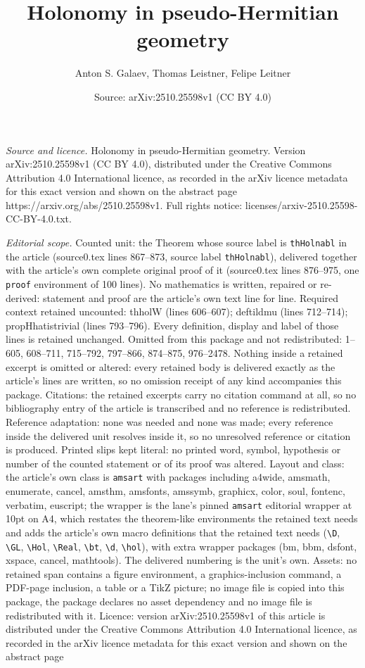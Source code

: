 \documentclass[10pt,a4paper]{amsart}
\title[Holonomy in pseudo-Hermitian geometry]{Holonomy in pseudo-Hermitian geometry}
\author{Anton S. Galaev, Thomas Leistner, Felipe Leitner}
\date{Source: arXiv:2510.25598v1 (CC BY 4.0)}
\begin{document}
\maketitle

\noindent\emph{Source and licence.} Holonomy in pseudo-Hermitian geometry. Version arXiv:2510.25598v1 (CC BY 4.0), distributed under the Creative Commons Attribution 4.0 International licence, as recorded in the arXiv licence metadata for this exact version and shown on the abstract page https://arxiv.org/abs/2510.25598v1. Full rights notice: licenses/arxiv-2510.25598-CC-BY-4.0.txt.\par\smallskip

\noindent\textit{Editorial scope.} Counted unit: the Theorem whose source label is \texttt{thHolnabl} in the article (source0.tex lines 867--873, source label \texttt{thHolnabl}), delivered together with the article's own complete original proof of it (source0.tex lines 876--975, one \texttt{proof} environment of 100 lines). No mathematics is written, repaired or re-derived: statement and proof are the article's own text line for line. Required context retained uncounted: thholW (lines 606--607); deftildmu (lines 712--714); propHhatistrivial (lines 793--796). Every definition, display and label of those lines is retained unchanged. Omitted from this package and not redistributed: 1--605, 608--711, 715--792, 797--866, 874--875, 976--2478. Nothing inside a retained excerpt is omitted or altered: every retained body is delivered exactly as the article's lines are written, so no omission receipt of any kind accompanies this package. Citations: the retained excerpts carry no citation command at all, so no bibliography entry of the article is transcribed and no reference is redistributed. Reference adaptation: none was needed and none was made; every reference inside the delivered unit resolves inside it, so no unresolved reference or citation is produced. Printed slips kept literal: no printed word, symbol, hypothesis or number of the counted statement or of its proof was altered. Layout and class: the article's own class is \texttt{amsart} with packages including a4wide, amsmath, enumerate, cancel, amsthm, amsfonts, amssymb, graphicx, color, soul, fontenc, verbatim, euscript; the wrapper is the lane's pinned \texttt{amsart} editorial wrapper at 10pt on A4, which restates the theorem-like environments the retained text needs and adds the article's own macro definitions that the retained text needs (\texttt{\textbackslash D}, \texttt{\textbackslash GL}, \texttt{\textbackslash Hol}, \texttt{\textbackslash Real}, \texttt{\textbackslash bt}, \texttt{\textbackslash d}, \texttt{\textbackslash hol}), with extra wrapper packages (bm, bbm, dsfont, xspace, cancel, mathtools). The delivered numbering is the unit's own. Assets: no retained span contains a figure environment, a graphics-inclusion command, a PDF-page inclusion, a table or a TikZ picture; no image file is copied into this package, the package declares no asset dependency and no image file is redistributed with it. Licence: version arXiv:2510.25598v1 of this article is distributed under the Creative Commons Attribution 4.0 International licence, as recorded in the arXiv licence metadata for this exact version and shown on the abstract page 
\end{document}
